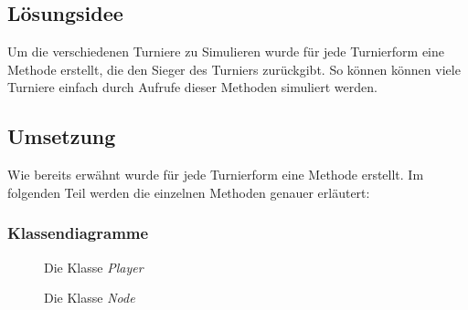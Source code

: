 \documentclass[a4paper, 12pt]{scrartcl}
\begin{document}
\subsection{Lösungsidee}

Um die verschiedenen Turniere zu Simulieren wurde  für jede Turnierform eine Methode erstellt, die den Sieger des Turniers zurückgibt. So können können viele Turniere einfach durch Aufrufe dieser Methoden simuliert werden.

\subsection{Umsetzung}

Wie bereits erwähnt wurde für jede Turnierform eine Methode erstellt. Im folgenden Teil werden die einzelnen Methoden genauer erläutert:

\subsubsection{Klassendiagramme}
\begin{figure}[H]
    \centering
    \caption{Die Klasse \emph{Player}}
    \end{figure}

    \begin{figure}[H]
    \centering
    \caption{Die Klasse \emph{Node}}
\end{figure}
\end{document}
